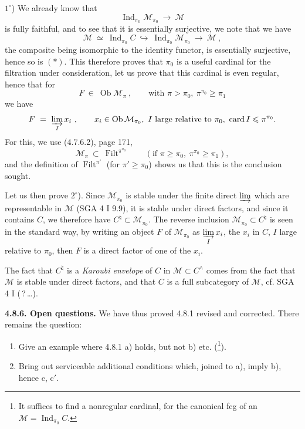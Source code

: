 \documentclass[11pt]{article}
\newcommand{\msp}[1]{\marginpar{\footnotesize [#1]}}
\newcommand{\Ob}{\operatorname{Ob}}
\newcommand{\Ind}{\operatorname{Ind}}
\newcommand{\Filt}{\operatorname{Filt}}
\newcommand{\card}{\operatorname{card}}
\begin{document}
$1^\circ$) We already know that
\[
\Ind_{\pi_0}\mathcal{M}_{\pi_0} \ \longrightarrow \ \mathcal{M} \tag*{$(*)$}
\]
is fully faithful, and to see that it is essentially surjective, we note that we have
\[
\mathcal{M} \ \simeq \ \Ind_{\pi_0}C \ \hookrightarrow \ \Ind_{\pi_0}\mathcal{M}_{\pi_0} \ \longrightarrow \ \mathcal{M} \ ,
\]
the composite being isomorphic to the identity functor, is essentially surjective, hence so is $(*)$. This therefore proves that $\pi_0$ is a useful cardinal for the filtration under consideration, let us prove that this cardinal is even regular, hence that for
\[
F \ \in \ \Ob\mathcal{M}_\pi \ , \qquad \text{with } \pi>\pi_0,\ \pi^{\pi_0}\geqslant\pi_1
\]
we have
\[
F \ = \ \varinjlim_I x_i \ , \qquad x_i\in\Ob\mathcal{M}_{\pi_0},\ I \text{ large relative to } \pi_0,\ \card I\leqslant\pi^{\pi_0}.
\]
\msp{page 202}
For this, we use (4.7.6.2), page 171,
\[
\mathcal{M}_\pi \ \subset \ \Filt^{\pi^{\pi_0}} \qquad (\text{if } \pi\geqslant\pi_0,\ \pi^{\pi_0}\geqslant\pi_1),
\]
and the definition of $\Filt^{\pi'}$ (for $\pi'\geqslant\pi_0$) shows us that this is the conclusion sought.

Let us then prove $2^\circ$). Since $\mathcal{M}_{\pi_0}$ is stable under the finite direct $\varinjlim$ which are representable in $\mathcal{M}$ (SGA 4 I 9.9), it is stable under direct factors, and since it contains $C$, we therefore have $C^\natural\subset\mathcal{M}_{\pi_0}$. The reverse inclusion $\mathcal{M}_{\pi_0}\subset C^\natural$ is seen in the standard way, by writing an object $F$ of $\mathcal{M}_{\pi_0}$ as $\varinjlim\limits_I x_i$, the $x_i$ in $C$, $I$ large relative to $\pi_0$, then $F$ is a direct factor of one of the $x_i$.

The fact that $C^\natural$ is a \textit{Karoubi envelope} of $C$ in $\mathcal{M}\subset C^\wedge$ comes from the fact that $\mathcal{M}$ is stable under direct factors, and that $C$ is a full subcategory of $\mathcal{M}$, cf. SGA 4 I (\,?\,\dots).

\textbf{4.8.6. Open questions.} We have thus proved 4.8.1 revised and corrected. There remains the question:
\begin{enumerate}
\item[1)] Give an example where 4.8.1 a) holds, but not b) etc. (\footnote{It suffices to find a nonregular cardinal, for the canonical fcg of an $\mathcal{M}=\Ind_{\pi_0}C$.}).
\item[2)] Bring out serviceable additional conditions which, joined to a), imply b), hence c, c$'$.
\end{enumerate}
\end{document}
